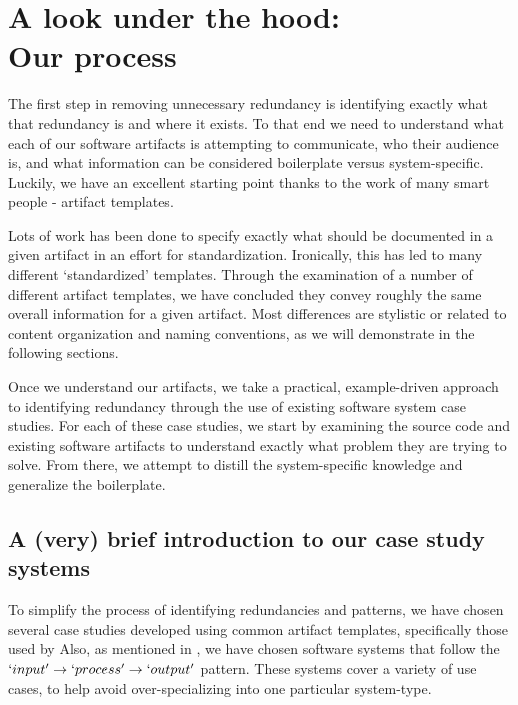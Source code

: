\chapter{A look under the hood: \\ Our process}

The first step in removing unnecessary redundancy is identifying exactly what
that redundancy is and where it exists. To that end we need to understand what
each of our software artifacts is attempting to communicate, who their audience
is, and what information can be considered boilerplate versus system-specific.
Luckily, we have an excellent starting point thanks to the work of many smart
people - artifact templates.

Lots of work  has been done to specify 
exactly what should be documented in a given artifact in an effort for 
standardization. Ironically, this has led to many different `standardized' 
templates. Through the examination of a number of different artifact templates, 
we have concluded they convey roughly the same overall information for a given 
artifact. Most differences are stylistic or related to content 
organization and naming conventions, as we will demonstrate in the following 
sections.

Once we understand our artifacts, we take a practical, example-driven approach
to identifying redundancy through the use of existing software system case
studies. For each of these case studies, we start by examining the source code
and existing software artifacts to understand exactly what problem they are
trying to solve. From there, we attempt to distill the system-specific knowledge
and generalize the boilerplate.

\section{A (very) brief introduction to our case study systems}

To simplify the process of identifying redundancies and patterns, we have chosen
several case studies developed using common artifact templates, specifically 
those used by \smithea{}  Also, as mentioned in 
\ds{[SCOPE]}, we have chosen software systems that follow the $`input' 
\rightarrow `process' \rightarrow `output'$ pattern. These systems cover a 
variety of use cases, to help avoid over-specializing into one particular 
system-type. 

